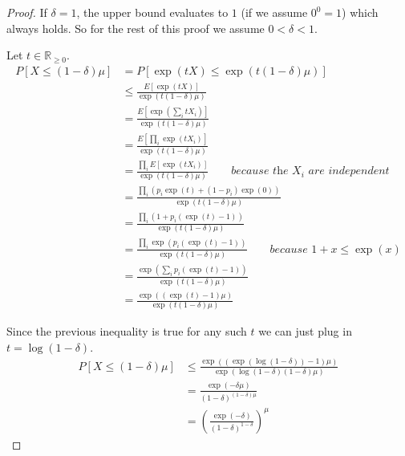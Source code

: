 \documentclass[10pt,a4paper]{article}
\begin{document}
\begin{proof}
  If $\delta = 1$, the upper bound evaluates to $1$ (if we assume $0^{0} = 1$) which always holds.
  So for the rest of this proof we assume $0 < \delta < 1$.

  Let $t \in \mathbb{R}_{\ge 0}$.
  \begin{align*}
    P[X \le (1 - \delta)\mu] & = P[\exp(tX) \le \exp(t(1 - \delta)\mu)]\\
                             & \le \frac{E[\exp(tX)]}{\exp(t(1 - \delta)\mu)}\\
                             & = \frac{E[\exp(\sum_{i} tX_{i})]}{\exp(t(1 - \delta)\mu)}\\
                             & = \frac{E[\prod_{i} \exp(tX_{i})]}{\exp(t(1 - \delta)\mu)}\\
                             & = \frac{\prod_{i} E[\exp(tX_{i})]}{\exp(t(1 - \delta)\mu)} \qquad \textit{because the $X_{i}$ are independent}\\
                             & = \frac{\prod_{i} \left( p_{i}\exp(t) + (1 - p_{i}) \exp(0) \right)}{\exp(t(1 - \delta)\mu)}\\
                             & = \frac{\prod_{i} \left( 1 + p_{i}\left( \exp(t) - 1\right) \right)}{\exp(t(1 - \delta)\mu)}\\
                             & = \frac{\prod_{i} \exp\left( p_{i}\left( \exp(t) - 1\right) \right)}{\exp(t(1 - \delta)\mu)} \qquad \textit{because $1 + x \le \exp(x)$}\\
                             & = \frac{\exp\left( \sum_{i} p_{i}\left( \exp(t) - 1\right) \right)}{\exp(t(1 - \delta)\mu)}\\
                             & = \frac{\exp\left( \left( \exp(t) - 1 \right)\mu \right)}{\exp(t(1 - \delta)\mu)}
  \end{align*}

  Since the previous inequality is true for any such $t$ we can just plug in $t = \log(1 - \delta)$.
  \begin{align*}
    P[X \le (1 - \delta)\mu] & \le \frac{\exp\left( \left( \exp(\log(1 - \delta)) - 1 \right)\mu \right)}{\exp(\log(1 - \delta)(1 - \delta)\mu)}\\
                             & = \frac{\exp\left( -\delta \mu \right)}{(1 - \delta)^{(1 - \delta)\mu}}\\
                             & = \left( \frac{\exp\left( -\delta \right)}{(1 - \delta)^{1 - \delta}} \right)^{\mu}
  \end{align*}


\end{proof}
\end{document}
